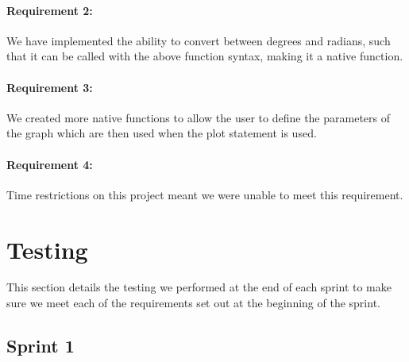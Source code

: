 \documentclass[a4paper, oneside, 11pt]{report}
\begin{document}
\subsubsection{Requirement 2: }
We have implemented the ability to convert between degrees and radians, such that it can be called with the above function syntax, making it a native function.

\subsubsection{Requirement 3: }
We created more native functions to allow the user to define the parameters of the graph which are then used when the plot statement is used.

\subsubsection{Requirement 4: }
Time restrictions on this project meant we were unable to meet this requirement.

\chapter{Testing}

This section details the testing we performed at the end of each sprint to make sure we meet each of the requirements set out at the beginning of the sprint.

\section{Sprint 1}
\end{document}
